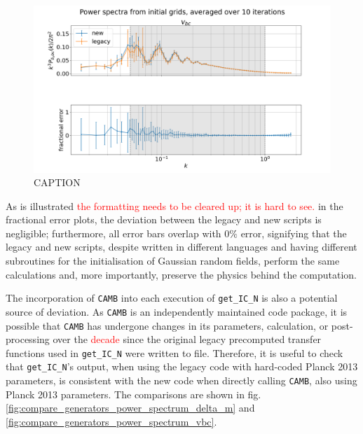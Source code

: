 \documentclass[floats,floatfix,showpacs,amssymb,prd,superscriptaddress,nofootinbib]{revtex4-2} %
\newcommand{\code}{\texttt}
\newcommand{\red}{\textcolor{red}}
\begin{document}
\begin{figure}[H]
    \centering
    \includegraphics[width=0.9\columnwidth]{images/ic_power_spectra/compare_generators_averaged_power_spectra_with_residual_noCAMB_v_bc.png}
    \caption{CAPTION}
    \label{fig:compare_generators_power_spectrum_noCAMB_vbc}
\end{figure}

\newpage
As is illustrated \red{the formatting needs to be cleared up; it is hard to see.} in the fractional error plots, the deviation between the legacy and new scripts is negligible; furthermore, all error bars overlap with $0 \%$ error, signifying that the legacy and new scripts, despite written in different languages and having different subroutines for the initialisation of Gaussian random fields, perform the same calculations and, more importantly, preserve the physics behind the computation.

The incorporation of \code{CAMB} into each execution of \code{get\_IC\_N} is also a potential source of deviation. As \code{CAMB} is an independently maintained code package, it is possible that \code{CAMB} has undergone changes in its parameters, calculation, or post-processing over the \red{decade} since the original legacy precomputed transfer functions used in \code{get\_IC\_N} were written to file. Therefore, it is useful to check that \code{get\_IC\_N}'s output, when using the legacy code with hard-coded Planck 2013 parameters, is consistent with the new code when directly calling \code{CAMB}, also using Planck 2013 parameters. The comparisons are shown in fig. \ref{fig:compare_generators_power_spectrum_delta_m} and \ref{fig:compare_generators_power_spectrum_vbc}.
\end{document}
